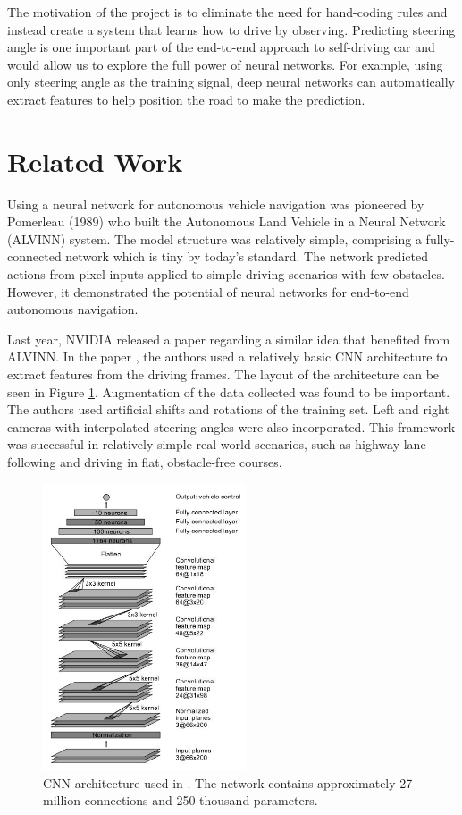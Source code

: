 \documentclass[10pt,twocolumn,letterpaper]{article}
\begin{document}
The motivation of the project is to eliminate the need for hand-coding rules and instead create a system that learns how to drive by observing. Predicting steering angle is one important part of the end-to-end approach to self-driving car and would allow us to explore the full power of neural networks. For example, using only steering angle as the training signal, deep neural networks can automatically extract features to help position the road to make the prediction.


\section{Related Work}

Using a neural network for autonomous vehicle navigation was pioneered by Pomerleau (1989) \cite{pomerleau1989alvinn} who built the Autonomous Land Vehicle in a Neural Network (ALVINN) system. The model structure was relatively simple, comprising a fully-connected network which is tiny by today’s standard. The network predicted actions from pixel inputs applied to simple driving scenarios with few obstacles. However, it demonstrated the potential of neural networks for end-to-end autonomous navigation. 

Last year, NVIDIA released a paper regarding a similar idea that benefited from ALVINN.  In the paper \cite{bojarski2016end}, the authors used a relatively basic CNN architecture to extract features from the driving frames. The layout of the architecture can be seen in Figure \ref{nvidiaimage}. Augmentation of the data collected was found to be important. The authors used artificial shifts and rotations of the training set. Left and right cameras with interpolated steering angles were also incorporated. This framework was successful in relatively simple real-world scenarios, such as highway lane-following and driving in flat, obstacle-free courses.  

\begin{figure}[!htb]
	\includegraphics[width=6cm]{nvidiacnn}
	\centering
	\caption{CNN architecture used in \cite{bojarski2016end}. The network contains approximately 27 million connections and 250 thousand parameters.}
	\label{nvidiaimage}
\end{figure}
\end{document}
